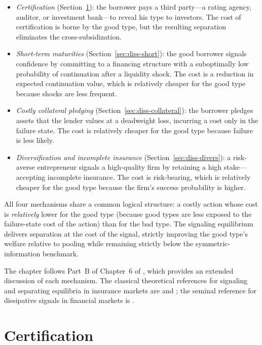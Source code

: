 \documentclass[11pt,a4paper,oneside]{book}
\theoremstyle{plain}
\theoremstyle{definition}
\theoremstyle{remark}
\numberwithin{equation}{chapter}
\begin{document}
\begin{itemize}
  \item \emph{Certification} (Section~\ref{sec:diss-cert}): the borrower pays a third party---a rating agency, auditor, or investment bank---to reveal his type to investors.
  The cost of certification is borne by the good type, but the resulting separation eliminates the cross-subsidization.
  \item \emph{Short-term maturities} (Section~\ref{sec:diss-short}): the good borrower signals confidence by committing to a financing structure with a suboptimally low probability of continuation after a liquidity shock.
  The cost is a reduction in expected continuation value, which is relatively cheaper for the good type because shocks are less frequent.
  \item \emph{Costly collateral pledging} (Section~\ref{sec:diss-collateral}): the borrower pledges assets that the lender values at a deadweight loss, incurring a cost only in the failure state.
  The cost is relatively cheaper for the good type because failure is less likely.
  \item \emph{Diversification and incomplete insurance} (Section~\ref{sec:diss-divers}): a risk-averse entrepreneur signals a high-quality firm by retaining a high stake---accepting incomplete insurance.
  The cost is risk-bearing, which is relatively cheaper for the good type because the firm's success probability is higher.
\end{itemize}

All four mechanisms share a common logical structure: a costly action whose cost is \emph{relatively} lower for the good type (because good types are less exposed to the failure-state cost of the action) than for the bad type.
The signaling equilibrium delivers separation at the cost of the signal, strictly improving the good type's welfare relative to pooling while remaining strictly below the symmetric-information benchmark.

The chapter follows Part~B of Chapter~6 of \citet{Tirole2006}, which provides an extended discussion of each mechanism.
The classical theoretical references for signaling and separating equilibria in insurance markets are \citet{RothschildStiglitz1976} and \citet{Stiglitz1977}; the seminal reference for dissipative signals in financial markets is \citet{LelandPyle1977}.

\section{Certification}
\label{sec:diss-cert}
\end{document}
